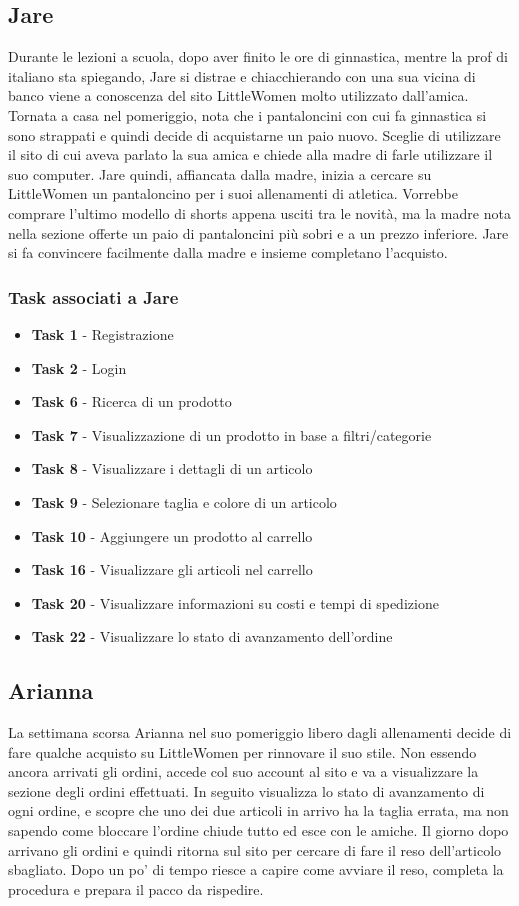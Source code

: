 \documentclass[12pt,a4paper]{report}
\begin{document}
\subsection*{Jare}
Durante le lezioni a scuola, dopo aver finito le ore di ginnastica, mentre la prof di italiano sta spiegando, Jare si distrae e chiacchierando con una sua vicina di banco viene a conoscenza del sito LittleWomen molto utilizzato dall'amica. Tornata a casa nel pomeriggio, nota che i pantaloncini con cui fa ginnastica si sono strappati e quindi decide di acquistarne un paio nuovo. Sceglie di utilizzare il sito di cui aveva parlato la sua amica e chiede alla madre di farle utilizzare il suo computer. Jare quindi, affiancata dalla madre, inizia a cercare su LittleWomen un pantaloncino per i suoi allenamenti di atletica. Vorrebbe comprare l'ultimo modello di shorts appena usciti tra le novità, ma la madre nota nella sezione offerte un paio di pantaloncini più sobri e a un prezzo inferiore. Jare si fa convincere facilmente dalla madre e insieme completano l'acquisto.
\subsubsection*{Task associati a Jare}
\begin{itemize}
\item \textbf{Task 1} - Registrazione
\item \textbf{Task 2} - Login
\item \textbf{Task 6} - Ricerca di un prodotto
\item \textbf{Task 7} - Visualizzazione di un prodotto in base a filtri/categorie
\item \textbf{Task 8} - Visualizzare i dettagli di un articolo
\item \textbf{Task 9} - Selezionare taglia e colore di un articolo
\item \textbf{Task 10} - Aggiungere un prodotto al carrello
\item \textbf{Task 16} - Visualizzare gli articoli nel carrello
\item \textbf{Task 20} - Visualizzare informazioni su costi e tempi di spedizione
\item \textbf{Task 22} - Visualizzare lo stato di avanzamento dell'ordine
\end{itemize}

\subsection*{Arianna}
La settimana scorsa Arianna nel suo pomeriggio libero dagli allenamenti decide di fare qualche acquisto su LittleWomen per rinnovare il suo stile. Non essendo ancora arrivati gli ordini, accede col suo account al sito e va a visualizzare la sezione degli ordini effettuati. In seguito visualizza lo stato di avanzamento di ogni ordine, e scopre che uno dei due articoli in arrivo ha la taglia errata, ma non sapendo come bloccare l'ordine chiude tutto ed esce con le amiche.
Il giorno dopo arrivano gli ordini e quindi ritorna sul sito per cercare di fare il reso dell'articolo sbagliato. Dopo un po' di tempo riesce a capire come avviare il reso, completa la procedura e prepara il pacco da rispedire.
\end{document}

